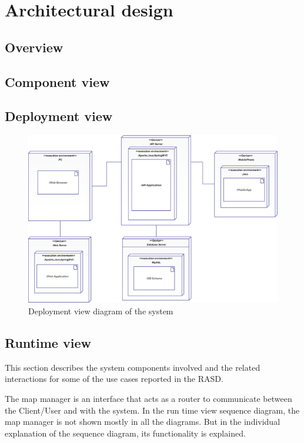\chapter{Architectural design}

\section{Overview}

\section{Component view}

\section{Deployment view}
\begin{figure}[h]
	\centering
	\includegraphics[width=\linewidth,keepaspectratio]{figures/deployment_view.eps}
	\caption{Deployment view diagram of the system}
	\label{fig:deployment_view}
\end{figure}

\section{Runtime view}
This section describes the system components involved and the related interactions for some of the use cases reported in the RASD.

The map manager is an interface that acts as a router to communicate between the Client/User and with the system. In the run time view sequence diagram,
the map manager is not shown mostly in all the diagrams. But in the individual explanation of the sequence diagram, its functionality is explained.

